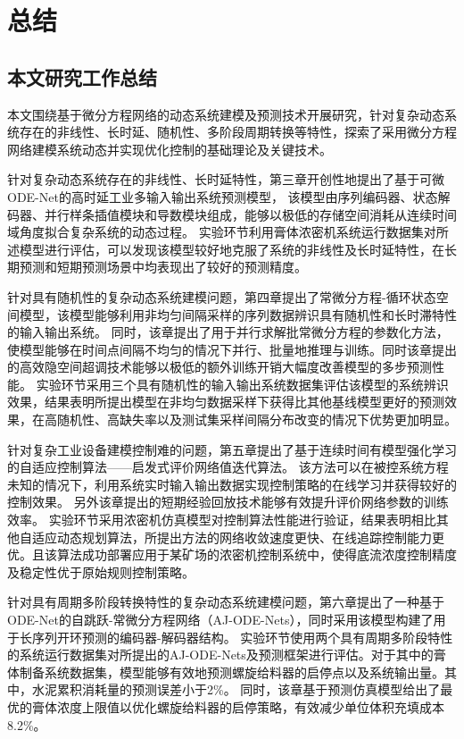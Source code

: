 \chapter{总结}
\section{本文研究工作总结}
本文围绕基于微分方程网络的动态系统建模及预测技术开展研究，针对复杂动态系统存在的非线性、长时延、随机性、多阶段周期转换等特性，探索了采用微分方程网络建模系统动态并实现优化控制的基础理论及关键技术。

针对复杂动态系统存在的非线性、长时延特性，第三章开创性地提出了基于可微ODE-Net的高时延工业多输入输出系统预测模型，
该模型由序列编码器、状态解码器、并行样条插值模块和导数模块组成，能够以极低的存储空间消耗从连续时间域角度拟合复杂系统的动态过程。
实验环节利用膏体浓密机系统运行数据集对所述模型进行评估，可以发现该模型较好地克服了系统的非线性及长时延特性，在长期预测和短期预测场景中均表现出了较好的预测精度。

针对具有随机性的复杂动态系统建模问题，第四章提出了常微分方程-循环状态空间模型，该模型能够利用非均匀间隔采样的序列数据辨识具有随机性和长时滞特性的输入输出系统。
同时，该章提出了用于并行求解批常微分方程的参数化方法，使模型能够在时间点间隔不均匀的情况下并行、批量地推理与训练。同时该章提出的高效隐空间超调技术能够以极低的额外训练开销大幅度改善模型的多步预测性能。
实验环节采用三个具有随机性的输入输出系统数据集评估该模型的系统辨识效果，结果表明所提出模型在非均匀数据采样下获得比其他基线模型更好的预测效果，在高随机性、高缺失率以及测试集采样间隔分布改变的情况下优势更加明显。

针对复杂工业设备建模控制难的问题，第五章提出了基于连续时间有模型强化学习的自适应控制算法——启发式评价网络值迭代算法。
该方法可以在被控系统方程未知的情况下，利用系统实时输入输出数据实现控制策略的在线学习并获得较好的控制效果。
另外该章提出的短期经验回放技术能够有效提升评价网络参数的训练效率。
实验环节采用浓密机仿真模型对控制算法性能进行验证，结果表明相比其他自适应动态规划算法，所提出方法的网络收敛速度更快、在线追踪控制能力更优。且该算法成功部署应用于某矿场的浓密机控制系统中，使得底流浓度控制精度及稳定性优于原始规则控制策略。

针对具有周期多阶段转换特性的复杂动态系统建模问题，第六章提出了一种基于ODE-Net的自跳跃-常微分方程网络（AJ-ODE-Nets），同时采用该模型构建了用于长序列开环预测的编码器-解码器结构。
实验环节使用两个具有周期多阶段特性的系统运行数据集对所提出的AJ-ODE-Nets及预测框架进行评估。对于其中的膏体制备系统数据集，模型能够有效地预测螺旋给料器的启停点以及系统输出量。其中，水泥累积消耗量的预测误差小于2\%。
同时，该章基于预测仿真模型给出了最优的膏体浓度上限值以优化螺旋给料器的启停策略，有效减少单位体积充填成本8.2\%。

